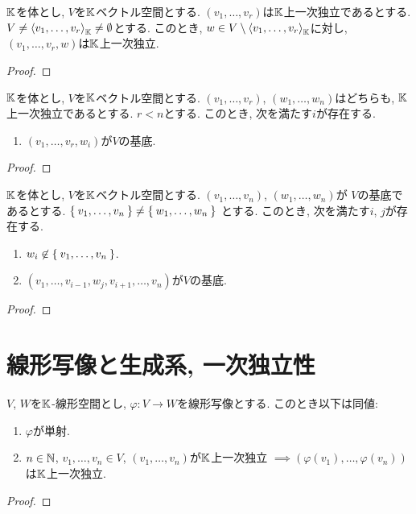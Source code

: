\begin{prop}
$\mathbb{K}$を体とし,
  $V$を$\mathbb{K}$ベクトル空間とする.
  $(v_1,\ldots, v_r)$は$\mathbb{K}$上一次独立であるとする.  
  $V\neq\Braket{v_1,\ldots, v_r}_{\mathbb{K}}\neq \emptyset$とする.
  このとき, $w\in V\setminus\Braket{v_1,\ldots, v_r}_{\mathbb{K}}$に対し,
  $(v_1,\ldots,v_{r},w)$は$\mathbb{K}$上一次独立.
\end{prop}
\begin{proof}\end{proof}

\begin{prop}
$\mathbb{K}$を体とし,
  $V$を$\mathbb{K}$ベクトル空間とする.
  $(v_1,\ldots, v_r)$,
  $(w_1,\ldots, w_n)$はどちらも,
  $\mathbb{K}$上一次独立であるとする.  
$r<n$とする.
このとき, 次を満たす$i$が存在する.
\begin{enumerate}
\item $(v_1,\ldots,v_{r},w_{i})$が$V$の基底.
\end{enumerate}
\end{prop}
\begin{proof}\end{proof}

\begin{prop}
  $\mathbb{K}$を体とし,
  $V$を$\mathbb{K}$ベクトル空間とする.
  $(v_1,\ldots, v_n)$,
  $(w_1,\ldots, w_n)$が
  $V$の基底であるとする.
$\Set{v_1,\ldots, v_n}\neq \Set{w_1,\ldots, w_n}$
とする.
このとき, 次を満たす$i$, $j$が存在する.
\begin{enumerate}
\item $w_i \not\in \Set{v_1,\ldots,v_n}$.
\item $(v_1,\ldots,v_{i-1},w_{j},v_{i+1},\ldots,v_n)$が$V$の基底.
\end{enumerate}
\end{prop}
\begin{proof}\end{proof}


\section{線形写像と生成系, 一次独立性}
\begin{prop}
  $V$, $W$を$\mathbb{K}$-線形空間とし,
  $\varphi\colon V\to W$を線形写像とする.
  このとき以下は同値:
  \begin{enumerate}
  \item $\varphi$が単射.
  \item $n\in \mathbb{N}$, $v_1,\ldots,v_n\in V$,
    $(v_1,\ldots,v_n)$が$\mathbb{K}$上一次独立
    $\implies (\varphi(v_1),\ldots,\varphi(v_n))$は$\mathbb{K}$上一次独立.
  \end{enumerate}
\end{prop}
\begin{proof}\end{proof}

